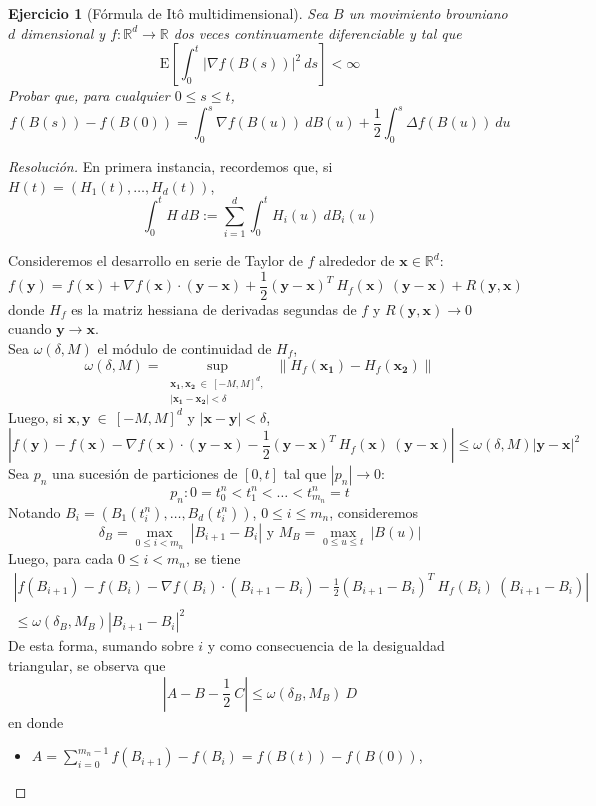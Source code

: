 \documentclass[a4paper,11pt]{article}
\newcommand{\abs}[1]{\ensuremath{\left\lvert #1 \right\rvert}}
\newcommand{\Exp}[1]{\ensuremath{\textrm{E}\left[#1\right]}}
\newcommand{\norm}[1]{\left\lVert#1\right\rVert}
\newcommand{\Real}{\mathbb{R}}
\newcommand{\Grad}[1]{\nabla #1}
\newcommand{\Lap}[1]{\Delta #1 }
\newcommand{\Dif}[1]{d #1}
\newcommand{\IntB}[1]{\int_0^t{#1~\Dif{B}}}
\newcommand{\IntBiu}[1]{\int_0^t{#1~\Dif{B_i(u)}}}
\newcommand{\vx}[1]{\mathbf{#1}}
\newtheorem*{ej}{Ejercicio}
\begin{document}

\begin{ej}[Fórmula de Itô multidimensional] 
Sea $B$ un movimiento browniano $d$ dimensional y $f : \Real^d \to \Real$ dos veces continuamente
diferenciable y tal que
$$\Exp{ \int_0^t{\abs{\Grad{f(B(s))}}}^2 ~\Dif{s}} < \infty$$
Probar que, para cualquier $0 \leq s \leq t$,
$$f(B(s)) - f(B(0)) = \int_0^s{\Grad{f(B(u))} ~\Dif{B(u)}} + \frac{1}{2} \int_0^s{\Lap{f(B(u))} ~\Dif{u}}$$
\end{ej}

\begin{proof}[Resoluci\'on]
En primera instancia, recordemos que, si $H(t) = \left(H_1(t),\dots,H_d(t)\right)$,
$$\IntB{H} := \sum_{i = 1}^{d}{\IntBiu{H_i(u)}}$$

Consideremos el desarrollo en serie de Taylor de $f$ alrededor de $\vx{x} \in \Real^d$:
$$f(\vx{y}) = f(\vx{x}) + \Grad{f(\vx{x})} \cdot (\vx{y} - \vx{x})
    + \frac{1}{2} (\vx{y} - \vx{x})^T ~ H_f(\vx{x}) ~ (\vx{y} - \vx{x}) 
    + R(\vx{y}, \vx{x})$$
donde $H_f$ es la matriz hessiana de derivadas segundas de $f$ y $R(\vx{y}, \vx{x}) \to 0$ cuando $\vx{y} \to \vx{x}$.\\

Sea $\omega(\delta, M)$ el módulo de continuidad de $H_f$,
$$\omega(\delta, M) = \underset{\substack{\vx{x_1}, \vx{x_2} ~ \in ~ [-M,M]^d, \\ \abs{\vx{x_1} - \vx{x_2}} < \delta}}
    {\sup} ~ \norm{H_f(\vx{x_1}) - H_f(\vx{x_2})}$$
Luego, si $\vx{x}, \vx{y} ~ \in ~ [-M,M]^d$ y $\abs{\vx{x} - \vx{y}} < \delta$,
$$\abs{f(\vx{y}) - f(\vx{x}) - \Grad{f(\vx{x})} \cdot (\vx{y} - \vx{x}) -\frac{1}{2} (\vx{y} - \vx{x})^T ~ H_f(\vx{x}) ~ (\vx{y} - \vx{x})}
    \leq \omega(\delta, M) \abs{\vx{y} - \vx{x}}^2$$
Sea $p_n$ una sucesión de particiones de $[0,t]$ tal que $\abs{p_n} \to 0$:
$$p_n : 0 = t_0^n < t_1^n < \dots < t_{m_n}^n = t$$
Notando $B_i = (B_1(t_i^n), \dots, B_d(t_i^n))$, $0 \leq i \leq m_n$, consideremos
$$\delta_B = \underset{0 \leq i < m_n}{\max} ~ \abs{B_{i+1} - B_i}
\textrm{ y }
M_B = \underset{0 \leq u \leq t}{\max} ~ \abs{B(u)}$$
Luego, para cada $0 \leq i < m_n$, se tiene
\begin{multline*}
    \abs{f(B_{i+1}) - f(B_i) - \Grad{f(B_i)} \cdot (B_{i+1} - B_i) -\frac{1}{2} (B_{i+1} - B_i)^T ~ H_f(B_i) ~ (B_{i+1} - B_i)} \\
    \leq \omega(\delta_B, M_B) \abs{B_{i+1} - B_i}^2
\end{multline*}
De esta forma, sumando sobre $i$ y como consecuencia de la desigualdad triangular, se observa que
$$\abs{A - B - \frac{1}{2} ~C} \leq \omega(\delta_B, M_B) ~ D$$
en donde
\begin{itemize}
    \item $A = \displaystyle \sum_{i = 0}^{m_n - 1}{f(B_{i+1}) - f(B_i)} = f(B(t)) - f(B(0))$,


\end{itemize}
\end{proof}
\end{document}
